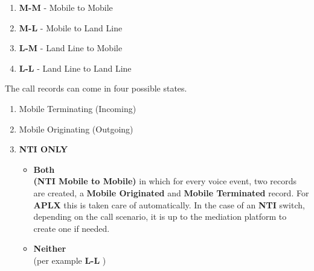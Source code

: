 \documentclass[12pt,twoside]{article}
\begin{document}
\small
\begin{enumerate}
\item \textbf{M-M} - Mobile to Mobile
\item \textbf{M-L} - Mobile to Land Line
\item \textbf{L-M} - Land Line to Mobile
\item \textbf{L-L} - Land Line to Land Line
\end{enumerate}
\normalsize
  The call records can come in four possible states. 
\small
\begin{enumerate}
\item Mobile Terminating (Incoming)
\item Mobile Originating (Outgoing)
\item \textbf{NTI ONLY}
\begin{itemize}
\item \textbf{Both} \\ \textbf{(NTI Mobile to Mobile)} in which for every voice event, two records
       are created, a \textbf{Mobile Originated} and \textbf{Mobile Terminated} record.
       For \textbf{APLX} this is taken care of automatically. In the case of an
       \textbf{NTI} switch, depending on the call scenario, it is up to the
       mediation platform to create one if needed.
\item \textbf{Neither} \\ (per example \textbf{L-L} )
\end{itemize}
\end{enumerate}
\normalsize
\end{document}
